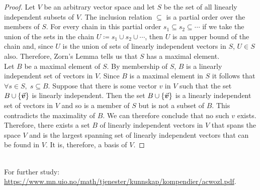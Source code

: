 \documentclass[MathsNotesBase.tex]{subfiles}
\begin{document}
{	
		\bigskip
		\begin{proof}
			Let $V$ be an arbitrary vector space and let $S$ be the set of all linearly independent subsets of $V$. The inclusion relation $\subseteq$ is a partial order over the members of $S$. For every chain in this partial order ${ s_1 \subseteq s_2 \subseteq \cdots }$ if we take the union of the sets in the chain ${ U \coloneqq s_1 \cup s_2 \cup \cdots }$, then $U$ is an upper bound of the chain and, since $U$ is the union of sets of linearly independent vectors in $S$, ${ U \in S }$ also. Therefore, Zorn's Lemma tells us that $S$ has a maximal element.\\
			Let $B$ be a maximal element of $S$. By membership of $S$, $B$ is a linearly independent set of vectors in $V$. Since $B$ is a maximal element in $S$ it follows that ${ \forall s \in S, \; s \subseteq B }$. Suppose that there is some vector $v$ in $V$ such that the set ${ B \cup \{\vec{\bm{v}}\} }$ is linearly independent. Then the set ${ B \cup \{\vec{\bm{v}}\} }$ is a linearly independent set of vectors in $V$ and so is a member of $S$ but is not a subset of $B$. This contradicts the maximality of $B$. We can therefore conclude that no such $v$ exists.\\
			Therefore, there exists a set $B$ of linearly independent vectors in $V$ that spans the space $V$ and is the largest spanning set of linearly independent vectors that can be found in $V$. It is, therefore, a basis of $V$.
		\end{proof}
		
		
		\bigskip
		\\
		
		For further study: \url{https://www.mn.uio.no/math/tjenester/kunnskap/kompendier/acwozl.pdf}.
	}
	
\end{document}
